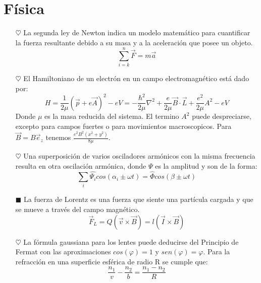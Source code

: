 \documentclass[letterpaper,12pt]{article}
\begin{document}
\section{Física}
\begin{itemize}
    \item [$\heartsuit$] La segunda ley de Newton indica un modelo matemático para cuantificar la fuerza resultante debido a su masa y a la aceleración que posee un objeto.
    \begin{equation*}
        \sum\limits_{i=k}^{n} \vec{F} = m \vec{a}
    \end{equation*}
    
    \item [$\heartsuit$] El Hamiltoniano de un electrón en un campo electromagnético está dado por:
    \begin{equation*}
        H= \frac{1}{2\mu}(\vec{p} + e\vec{A})^2 - eV = -\frac{\hbar^2}{2\mu} \nabla^2 + \frac{e}{2\mu} \vec{B} \cdot \vec{L} + \frac{e^2}{2\mu}A^2- eV
    \end{equation*}
    Donde $\mu$ es la masa reducida del sistema. El termino $A^2$ puede despreciarse, excepto para campos fuertes o para movimientos macroscopicos. Para $\vec{B} = B\vec{e}_z$ tenemos $\tfrac{e^2 B^2(x^2 + y^2)}{8\mu}$.
     
    \item [$\heartsuit$] Una superposición de varios osciladores armónicos con la misma frecuencia resulta en otra oscilación armónica, donde $\varPsi$ es la amplitud y son de la forma:
    \begin{equation*}
        \sum\limits_{i}^{} \hat{\varPsi_i} cos(\alpha_i \pm \omega t) = \hat{\Phi} cos(\beta \pm \omega t)
    \end{equation*}
    
    \item [$\blacksquare$] La fuerza de Lorentz es una fuerza que siente una partícula cargada y que se mueve a través del campo magnético.
    \begin{equation*}
        \vec{F}_L = Q(\vec{v} \times \vec{B}) = l(\vec{I} \times \vec{B})
    \end{equation*}
     
    \item [$\heartsuit$] La fórmula gaussiana para los lentes puede deducirse del Principio de Fermat con las aproximaciones $cos(\varphi)= 1$ y $sen(\varphi)= \varphi$. Para la refracción en una superficie esférica de radio R se cumple que:
    \begin{equation*}
        \frac{n_1}{v} - \frac{n_2}{b} = \frac{n_1 - n_2}{R}
    \end{equation*}
    

\end{itemize}
\end{document}

